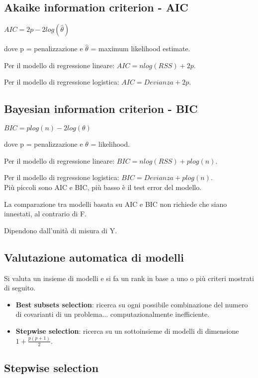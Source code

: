 \subsection{Akaike information criterion - AIC}

$AIC = 2p - 2log(\hat{\theta})$

dove p = penalizzazione e $\hat{\theta}$ = maximum likelihood estimate.

Per il modello di regressione lineare: $AIC = nlog(RSS) + 2p$.

Per il modello di regressione logistica: $AIC = Devianza + 2p$.

\subsection{Bayesian information criterion - BIC}

$BIC = plog(n) - 2log(\theta)$

dove p = penalizzazione e $\theta$ = likelihood.

Per il modello di regressione lineare: $BIC = nlog(RSS) + plog(n)$.

Per il modello di regressione logistica: $BIC = Devianza + plog(n)$.\\

Più piccoli sono AIC e BIC, più basso è il test error del modello.

La comparazione tra modelli basata su AIC e BIC non richiede che siano
innestati, al contrario di F.

Dipendono dall'unità di misura di Y.

\subsection{Valutazione automatica di modelli}

Si valuta un insieme di modelli e si fa un rank in base a uno o più
criteri mostrati di seguito.

\begin{itemize}
 \item \textbf{Best subsets selection}: ricerca su ogni possibile
combinazione del numero di covarianti di un problema... computazionalmente
inefficiente.
 \item \textbf{Stepwise selection}: ricerca su un sottoinsieme di
modelli di dimensione $1 + \frac{p(p+1)}{2}$.
\end{itemize}

\subsection{Stepwise selection}

